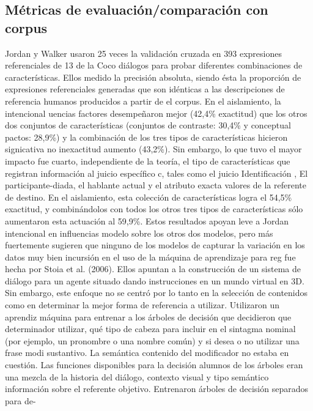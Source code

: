\subsection{M\'etricas de evaluaci\'on/comparaci\'on con corpus}
\label{sec:metricas_evaluacion}
Jordan y Walker usaron 25 veces la validaci\'on cruzada en 393 expresiones referenciales
de 13 de la Coco di\'alogos para probar diferentes combinaciones de caracter\'isticas. Ellos
medido la precisi\'on absoluta, siendo \'esta la proporci\'on de expresiones referenciales
generadas que son id\'enticas a las descripciones de referencia humanos producidos a partir de
el corpus. En el aislamiento, la intencional uencias factores desempe\~naron mejor (42,4\%
exactitud) que los otros dos conjuntos de caracter\'isticas (conjuntos de contraste: 30,4\% y conceptual
pactos: 28,9\%) y la combinaci\'on de los tres tipos de caracter\'isticas hicieron signicativa no inexactitud aumento (43,2\%). Sin embargo, lo que tuvo el mayor impacto fue cuarto,
independiente de la teor\'ia, el tipo de caracter\'isticas que registran informaci\'on al juicio espec\'ifico c, tales
como el juicio
Identificaci\'on
, El participante-diada, el hablante actual y el atributo exacta
valores de la referente de destino. En el aislamiento, esta colecci\'on de caracter\'isticas logra el 54,5\%
exactitud, y combin\'andolos con todos los otros tres tipos de caracter\'isticas s\'olo aumentaron
esta actuaci\'on al 59,9\%. Estos resultados apoyan leve a Jordan intencional
en
influencias modelo sobre los otros dos modelos, pero m\'as fuertemente sugieren que ninguno
de los modelos de capturar la variaci\'on en los datos muy bien
incursi\'on en el uso de la m\'aquina de aprendizaje para
reg
fue hecha por Stoia et al.
(2006). Ellos apuntan a la construcci\'on de un sistema de di\'alogo para un agente situado dando
instrucciones en un mundo virtual en 3D. Sin embargo, este enfoque no se centr\'o por lo
tanto en la selecci\'on de contenidos como en determinar la mejor forma de referencia a utilizar.
Utilizaron un aprendiz m\'aquina para entrenar a los \'arboles de decisi\'on que decidieron que determinador
utilizar, qu\'e tipo de cabeza para incluir en el sintagma nominal (por ejemplo, un pronombre o una
nombre com\'un) y si desea o no utilizar una frase modi sustantivo. La sem\'antica
contenido del modificador no estaba en cuesti\'on. Las funciones disponibles para la decisi\'on
alumnos de los \'arboles eran una mezcla de la historia del di\'alogo, contexto visual y tipo sem\'antico
informaci\'on sobre el referente objetivo. Entrenaron \'arboles de decisi\'on separados para de-
